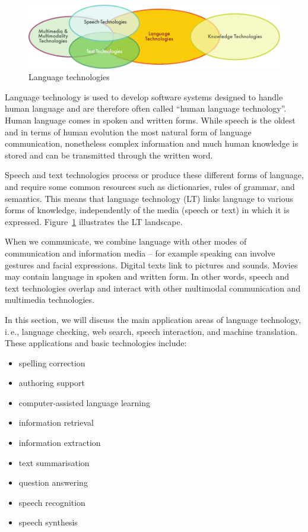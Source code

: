 \begin{multicols}{2}

\begin{figure}[htb]
  \center
  \includegraphics[width=\textwidth]{../_media/english/language_technologies}
  \caption{Language technologies}
\label{fig:ltincontext_en}
\end{figure}

Language technology is used to develop software systems designed to handle human language and are therefore often called ``human language technology''. Human language comes in spoken and written forms. While speech is the oldest and in terms of human evolution the most natural form of language communication, nonetheless complex information and much human knowledge is stored and can be transmitted through the written word. 

Speech and text technologies process or produce these different forms of language, and require some common resources such as dictionaries, rules of grammar, and semantics. This means that language technology (LT) links language to various forms of knowledge, independently of the media (speech or text) in which it is expressed. Figure~\ref{fig:ltincontext_en} illustrates the LT landscape.

When we communicate, we combine language with other modes of communication and information media -- for example speaking can involve gestures and facial expressions. Digital texts link to pictures and sounds. Movies may contain language in spoken and written form. In other words, speech and text technologies overlap and interact with other multimodal communication and multimedia technologies.

In this section, we will discuss the main application areas of language technology, i.\,e., language checking, web search, speech interaction, and machine translation. These applications and basic technologies include:\columnbreak

\begin{itemize}
\item spelling correction
\item authoring support
\item computer-assisted language learning
\item information retrieval 
\item information extraction
\item text summarisation
\item question answering
\item speech recognition 
\item speech synthesis 
\end{itemize}


\end{multicols}
